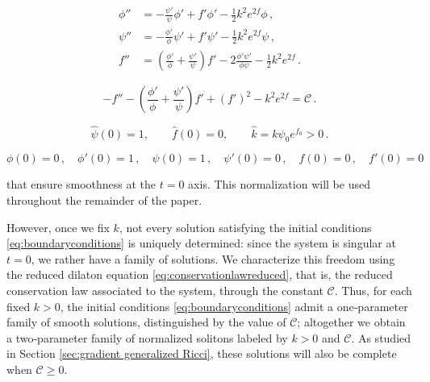 \documentclass[10pt,a4paper]{amsart}
\newcommand{\cC}{\mathcal{C}}
\begin{document}
\begin{align}
\phi'' &= -\frac{\psi'}{\psi} \phi' + f' \phi' - \frac{1}{2}k^2 e^{2f} \phi \,, \label{eq:phi''} \\
\psi'' &= -\frac{\phi'}{\phi} \psi' + f' \psi' - \frac{1}{2}k^2 e^{2f} \psi \,, \label{eq:psi''} \\
f'' &= \left(\frac{\phi'}{\phi} + \frac{\psi'}{\psi}\right) f' - 2\frac{\phi'\psi'}{\phi\psi} - \frac{1}{2}k^2 e^{2f} \,. \label{eq:f''}
\end{align}

\begin{equation}\label{eq:conservationlawreduced}
- f'' - \left( \frac{\phi'}{\phi} + \frac{\psi'}{\psi} \right) f' + (f')^2 - k^2 e^{2f} = \cC \,.
\end{equation}

\begin{equation}\label{eq:normalizedinitial}
\hat{\psi}(0)=1, \qquad \hat{f}(0)=0, \qquad \hat{k} = k \psi_0e^{f_0} > 0 \,.
\end{equation}

\begin{equation}\label{eq:boundaryconditions}
\phi(0)=0 \,, \quad \phi'(0)=1 \,, \quad \psi(0)=1 \,, \quad \psi'(0)=0 \,, \quad f(0)=0 \,, \quad f'(0)=0
\end{equation}

that ensure smoothness at the $t=0$ axis. This normalization will be used throughout the remainder of the paper.

However, once we fix $k$, not every solution satisfying the initial conditions \eqref{eq:boundaryconditions} is uniquely determined: since the system is singular at $t=0$, we rather have a family of solutions. We characterize this freedom using the reduced dilaton equation \eqref{eq:conservationlawreduced}, that is, the reduced conservation law associated to the system, through the constant $\cC$. Thus, for each fixed $k>0$, the initial conditions \eqref{eq:boundaryconditions} admit a one‑parameter family of smooth solutions, distinguished by the value of $\cC$; altogether we obtain a two‑parameter family of normalized solitons labeled by $k>0$ and $\cC$. As studied in Section \ref{sec:gradient generalized Ricci}, these solutions will also be complete when $\cC\ge0$.

\end{document}
